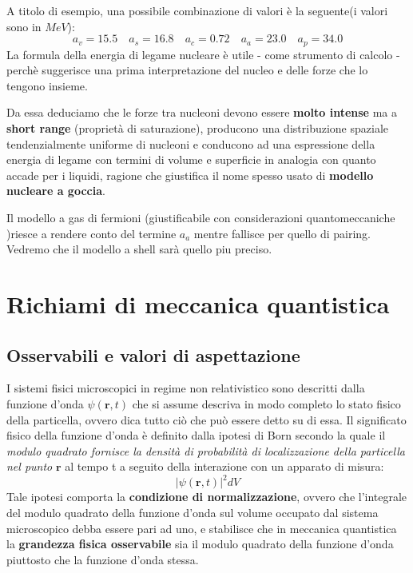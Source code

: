 A titolo di esempio, una possibile combinazione di valori è la seguente(i
valori sono in \(MeV\)):
\[
	a_{v} = 15.5 \quad a_{s} = 16.8 \quad a_{c} = 0.72 \quad a_{a} = 23.0 \quad a_{p} = 34.0
\]
La formula della energia di legame nucleare è utile - come strumento di
calcolo - perchè suggerisce una prima interpretazione del nucleo e delle
forze che lo tengono insieme.

Da essa deduciamo che le forze tra nucleoni devono essere \textbf{molto
	intense} ma a \textbf{short range} (proprietà di saturazione), producono
una distribuzione spaziale tendenzialmente uniforme di nucleoni e
conducono ad una espressione della energia di legame con termini di
volume e superficie in analogia con quanto accade per i liquidi, ragione
che giustifica il nome spesso usato di \textbf{modello nucleare a
	goccia}.

Il modello a gas di fermioni (giustificabile con considerazioni
quantomeccaniche )riesce a rendere conto del termine \(a_{a}\) mentre
fallisce per quello di pairing.
Vedremo che il modello a shell sarà
quello piu preciso.


\section{Richiami di meccanica quantistica}\label{richiami-di-meccanica-quantistica}

\subsection{Osservabili e valori di aspettazione}\label{sec:osservabili-e-valori-di-aspettazione}

I sistemi fisici microscopici in regime non relativistico sono descritti
dalla funzione d'onda \(\psi(\bm{r},t)\) che si assume descriva in modo
completo lo stato fisico della particella, ovvero dica tutto ciò che può
essere detto su di essa.
Il significato fisico della funzione d'onda è
definito dalla ipotesi di Born secondo la quale il \emph{modulo quadrato
	fornisce la densità di probabilità di localizzazione della particella
	nel punto} \(\bm{r}\) al tempo t a seguito della interazione con un
apparato di misura: \[
	| \psi(\bm{r},t)|^{2}dV
\] Tale ipotesi comporta la \textbf{condizione di normalizzazione},
ovvero che l'integrale del modulo quadrato della funzione d'onda sul
volume occupato dal sistema microscopico debba essere pari ad uno, e
stabilisce che in meccanica quantistica la \textbf{grandezza fisica
	osservabile} sia il modulo quadrato della funzione d'onda piuttosto che
la funzione d'onda stessa.

